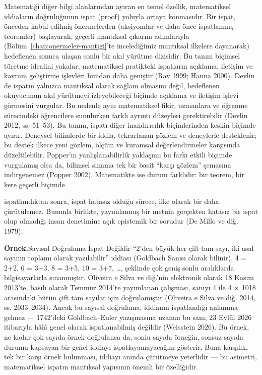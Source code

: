 Matematiği diğer bilgi alanlarından ayıran en temel özellik, matematiksel iddiaların doğruluğunun ispat (proof) yoluyla ortaya konmasıdır. Bir ispat, önceden kabul edilmiş önermelerden (aksiyomlar ve daha önce ispatlanmış teoremler) başlayarak, geçerli mantıksal çıkarım adımlarıyla (Bölüm~\ref{chap:onermeler-mantigi}’te incelediğimiz mantıksal ilkelere dayanarak) hedeflenen sonuca ulaşan sonlu bir akıl yürütme dizisidir. Bu tanım biçimsel türetme idealini yakalar; matematiksel pratikteki ispatların açıklama, iletişim ve kavram geliştirme işlevleri bundan daha geniştir (Rav 1999; Hanna 2000). Devlin de ispatın yalnızca mantıksal olarak sağlam olmasını değil, hedeflenen okuyucunun akıl yürütmeyi izleyebileceği biçimde açıklama ve iletişim işlevi görmesini vurgular. Bu nedenle aynı matematiksel fikir, uzmanlara ve öğrenme sürecindeki öğrencilere sunulurken farklı ayrıntı düzeyleri gerektirebilir (Devlin 2012, ss. 51–53). Bu tanım, ispatı diğer inandırıcılık biçimlerinden keskin biçimde ayırır. Deneysel bilimlerde bir iddia, tekrarlanan gözlem ve deneylerle desteklenir; bu destek ilkece yeni gözlem, ölçüm ve kuramsal değerlendirmeler karşısında düzeltilebilir. Popper’ın yanlışlanabilirlik yaklaşımı bu farkı etkili biçimde vurgulamış olsa da, bilimsel sınama tek bir basit “karşı gözlem” şemasına indirgenemez (Popper 2002). Matematikte ise durum farklıdır: bir teorem, bir kere geçerli biçimde

ispatlandıktan sonra, ispat hatasız olduğu sürece, ilke olarak bir daha çürütülemez. Bununla birlikte, yayımlanmış bir metnin gerçekten hatasız bir ispat olup olmadığı insan denetimine açık epistemik bir sorudur (De Millo ve diğ. 1979).

\begin{tcolorbox}[bookbox,colback=cEx]\textbf{\textsf{\textcolor{cAcc}{Örnek.}}}\quad Sayısal Doğrulama İspat Değildir “2’den büyük her çift tam sayı, iki asal sayının toplamı olarak yazılabilir” iddiası (Goldbach Sanısı olarak bilinir), 4 = 2+2, 6 = 3+3, 8 = 3+5, 10 = 3+7, …, şeklinde çok geniş sonlu aralıklarda bilgisayarlarla sınanmıştır. Oliveira e Silva ve diğ.’nin elektronik olarak 18 Kasım 2013’te, basılı olarak Temmuz 2014’te yayımlanan çalışması, sanıyı 4 ile 4 × 1018 arasındaki bütün çift tam sayılar için doğrulamıştır (Oliveira e Silva ve diğ. 2014, ss. 2033–2034). Ancak bu sayısal doğrulama, iddianın ispatlandığı anlamına gelmez — 1742’deki Goldbach–Euler yazışmasına uzanan bu sanı, 23 Eylül 2026 itibarıyla hâlâ genel olarak ispatlanabilmiş değildir (Weisstein 2026). Bu örnek, ne kadar çok sayıda örnek doğrulansa da, sonlu sayıda örneğin, sonsuz sayıda durumu kapsayan bir genel iddiayı ispatlayamayacağını gösterir. Buna karşılık, tek bir karşı örnek bulunması, iddiayı anında çürütmeye yeterlidir — bu asimetri, matematiksel ispatın mantıksal yapısının önemli bir özelliğidir.\end{tcolorbox}

